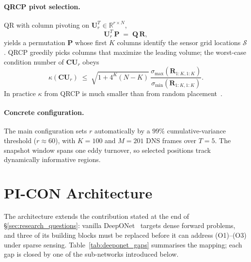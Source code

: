\paragraph{QRCP pivot selection.}
QR with column pivoting on $\mathbf{U}_r^T\in\mathbb{R}^{r\times N}$,
\begin{equation*}
    \mathbf{U}_r^T \,\mathbf{P} \;=\; \mathbf{Q}\,\mathbf{R},
\end{equation*}
yields a permutation $\mathbf{P}$ whose first $K$ columns identify the sensor grid locations $\mathcal{S}$. QRCP greedily picks columns that maximize the leading volume; the worst-case condition number of $\mathbf{C}\mathbf{U}_r$ obeys
\begin{equation*}
    \kappa(\mathbf{C}\mathbf{U}_r) \;\le\; \sqrt{1 + 4^K (N - K)}\,\frac{\sigma_{\max}(\mathbf{R}_{1:K,1:K})}{\sigma_{\min}(\mathbf{R}_{1:K,1:K})}.
\end{equation*}
In practice $\kappa$ from QRCP is much smaller than from random placement~\cite{Drmac2016SISC, Manohar2018PNAS}.

\paragraph{Concrete configuration.}
The main configuration sets $r$ automatically by a $99\%$ cumulative-variance threshold ($r\approx 60$), with $K=100$ and $M = 201$ DNS frames over $T=5$. The snapshot window spans one eddy turnover, so selected positions track dynamically informative regions.

\section{PI-CON Architecture}
\label{sec:architecture}

The architecture extends the contribution stated at the end of \S\ref{sec:research_questions}: vanilla DeepONet~\cite{Lu2021NMI} targets dense forward problems, and three of its building blocks must be replaced before it can address (O1)--(O3) under sparse sensing. Table~\ref{tab:deeponet_gaps} summarises the mapping; each gap is closed by one of the sub-networks introduced below.

